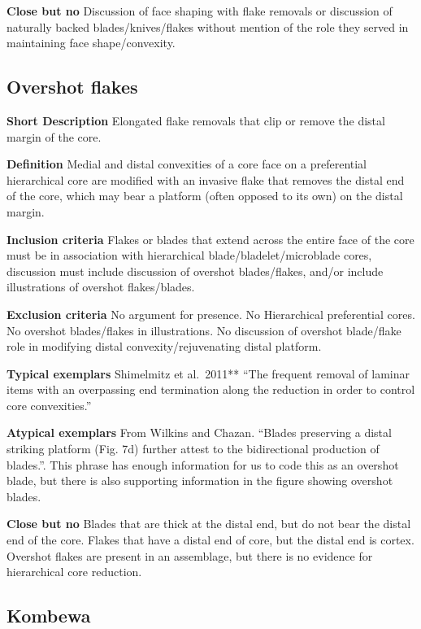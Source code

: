 \documentclass[
]{article}
\begin{document}
\textbf{Close but no} Discussion of face shaping with flake removals or
discussion of naturally backed blades/knives/flakes without mention of
the role they served in maintaining face shape/convexity.

\hypertarget{overshot-flakes}{%
\subsection{Overshot flakes}\label{overshot-flakes}}

\textbf{Short Description} Elongated flake removals that clip or remove
the distal margin of the core.

\textbf{Definition} Medial and distal convexities of a core face on a
preferential hierarchical core are modified with an invasive flake that
removes the distal end of the core, which may bear a platform (often
opposed to its own) on the distal margin.

\textbf{Inclusion criteria} Flakes or blades that extend across the
entire face of the core must be in association with hierarchical
blade/bladelet/microblade cores, discussion must include discussion of
overshot blades/flakes, and/or include illustrations of overshot
flakes/blades.

\textbf{Exclusion criteria} No argument for presence. No Hierarchical
preferential cores. No overshot blades/flakes in illustrations. No
discussion of overshot blade/flake role in modifying distal
convexity/rejuvenating distal platform.

\textbf{Typical exemplars} Shimelmitz et al.~2011** ``The frequent
removal of laminar items with an overpassing end termination along the
reduction in order to control core convexities.''

\textbf{Atypical exemplars} From Wilkins and Chazan. ``Blades preserving
a distal striking platform (Fig. 7d) further attest to the bidirectional
production of blades.''. This phrase has enough information for us to
code this as an overshot blade, but there is also supporting information
in the figure showing overshot blades.

\textbf{Close but no} Blades that are thick at the distal end, but do
not bear the distal end of the core. Flakes that have a distal end of
core, but the distal end is cortex. Overshot flakes are present in an
assemblage, but there is no evidence for hierarchical core reduction.

\hypertarget{kombewa}{%
\subsection{Kombewa}\label{kombewa}}
\end{document}
